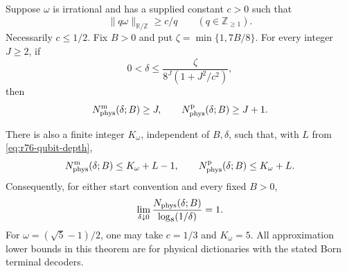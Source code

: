 \begin{theorem}
\label{thm:r76-physical-logarithm}
Suppose $\omega$ is irrational and has a supplied constant $c>0$ such that
\begin{equation}\label{eq:r76-phase-separation}
 \|q\omega\|_{\mathbb R/\mathbb Z}\ge c/q
 \qquad(q\in\mathbb Z_{\ge1}).
\end{equation}
Necessarily $c\le1/2$.  Fix $B>0$ and put $\zeta=\min\{1,7B/8\}$.
For every integer $J\ge2$, if
\begin{equation}\label{eq:r76-physical-lower-condition}
 0<\delta\le\frac{\zeta}{8^J(1+J^2/c^2)},
\end{equation}
then
\begin{equation}\label{eq:r76-physical-lower}
 N_{\rm phys}^{\rm m}(\delta;B)\ge J,
 \qquad N_{\rm phys}^{\rm p}(\delta;B)\ge J+1.
\end{equation}

There is also a finite integer $K_\omega$, independent of $B,\delta$,
such that, with $L$ from \eqref{eq:r76-qubit-depth},
\begin{equation}\label{eq:r76-physical-upper}
 N_{\rm phys}^{\rm m}(\delta;B)\le K_\omega+L-1,
 \qquad N_{\rm phys}^{\rm p}(\delta;B)\le K_\omega+L.
\end{equation}
Consequently, for either start convention and every fixed $B>0$,
\begin{equation}\label{eq:r76-physical-log-limit}
 \lim_{\delta\downarrow0}
 \frac{N_{\rm phys}(\delta;B)}{\log_8(1/\delta)}=1.
\end{equation}
For $\omega=(\sqrt5-1)/2$, one may take $c=1/3$ and $K_\omega=5$.
All approximation lower bounds in this theorem are for physical
dictionaries with the stated Born terminal decoders.
\end{theorem}
